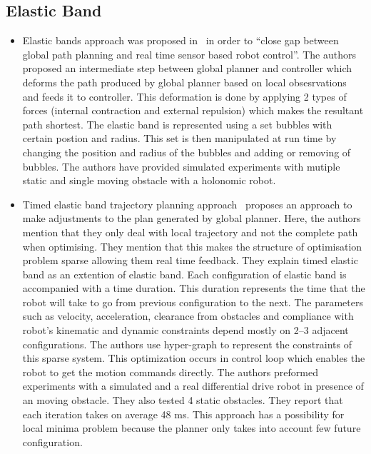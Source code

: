 \subsection{Elastic Band}%
\label{sub:elastic_band}
\begin{itemize}
    \item Elastic bands approach was proposed in~\cite{quinlan1993elastic} in order to ``close 
        gap between global path planning and real time sensor based robot control''\cite{quinlan1993elastic}.
        The authors proposed an intermediate step between global planner and controller which deforms the
        path produced by global planner based on local obsesrvations and feeds it to controller. This 
        deformation is done by applying 2 types of forces (internal contraction and external repulsion)
        which makes the resultant path shortest. The elastic band is represented using a set bubbles with 
        certain postion and radius. This set is then manipulated at run time by changing the position
        and radius of the bubbles and adding or removing of bubbles. The authors have provided simulated 
        experiments with mutiple static and single moving obstacle with a holonomic robot.

    \item Timed elastic band trajectory planning approach~\cite{rosmann2013efficient} proposes an 
        approach to make adjustments to the plan generated by global planner. Here, the authors 
        mention that they only deal with local trajectory and not the complete path when optimising.
        They mention that this makes the structure of optimisation problem sparse allowing them real
        time feedback. They explain timed elastic band as an extention of elastic band. Each configuration
        of elastic band is accompanied with a time duration. This duration represents the time that
        the robot will take to go from previous configuration to the next. The parameters such as
        velocity, acceleration, clearance from obstacles and compliance with robot's kinematic and
        dynamic constraints depend mostly on 2--3 adjacent configurations. The authors use hyper-graph 
        to represent the constraints of this sparse system. This optimization occurs in control loop
        which enables the robot to get the motion commands directly. The authors preformed experiments 
        with a simulated and a real differential drive robot in presence of an moving obstacle. They 
        also tested 4 static obstacles. They report that each iteration takes on average 48 ms. This 
        approach has a possibility for local minima problem because the planner only takes into account
        few future configuration. 
        

\end{itemize}
